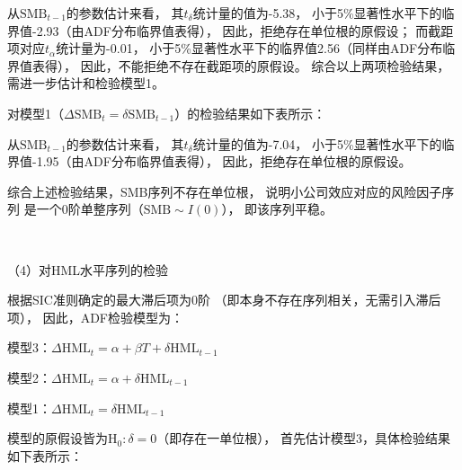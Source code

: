 \documentclass[UTF8]{ctexart}
\begin{document}
从$\text{SMB}_{t-1}$的参数估计来看，
其$t_{\delta}$统计量的值为-5.38，
小于5\%显著性水平下的临界值-2.93（由ADF分布临界值表得），
因此，拒绝存在单位根的原假设；
而截距项对应$t_{\alpha}$统计量为-0.01，
小于5\%显著性水平下的临界值2.56（同样由ADF分布临界值表得），
因此，不能拒绝不存在截距项的原假设。
综合以上两项检验结果，需进一步估计和检验模型1。

对模型1（$\Delta \text{SMB}_{t} = \delta \text{SMB}_{t-1}$）的检验结果如下表所示：


从$\text{SMB}_{t-1}$的参数估计来看，
其$t_{\delta}$统计量的值为-7.04，
小于5\%显著性水平下的临界值-1.95（由ADF分布临界值表得），
因此，拒绝存在单位根的原假设。

综合上述检验结果，SMB序列不存在单位根，
说明小公司效应对应的风险因子序列
是一个0阶单整序列（$\text{SMB} \sim I(0)$），
即该序列平稳。

$\ $

（4）对HML水平序列的检验

根据SIC准则确定的最大滞后项为0阶
（即本身不存在序列相关，无需引入滞后项），
因此，ADF检验模型为：

模型3：$\Delta \text{HML}_{t} = \alpha + \beta T +\delta \text{HML}_{t-1}$

模型2：$\Delta \text{HML}_{t} = \alpha + \delta  \text{HML}_{t-1}$

模型1：$\Delta \text{HML}_{t} = \delta \text{HML}_{t-1}$


模型的原假设皆为$\text{H}_0:\delta=0$（即存在一单位根），
首先估计模型3，具体检验结果如下表所示：
\end{document}
